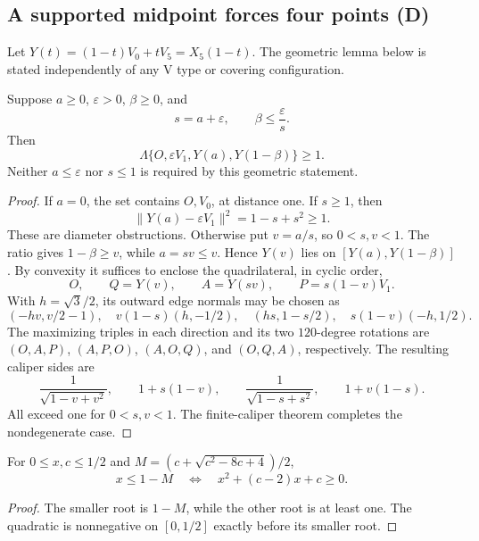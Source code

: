 \subsection{A supported midpoint forces four points (D)}

Let $Y(t)=(1-t)V_0+tV_5=X_5(1-t)$. The geometric lemma below is stated
independently of any V type or covering configuration.

\begin{theorem}
\label{thm:fixed-four-point-rescuer}
\label{lem:appendix-fixed-four-point}
Suppose $a\ge0$, $\varepsilon>0$, $\beta\ge0$, and
\[
 s=a+\varepsilon,\qquad \beta\le\frac{\varepsilon}{s}.
\]
Then
\[
 \Lambda\{O,\varepsilon V_1,Y(a),Y(1-\beta)\}\ge1.
\]
Neither $a\le\varepsilon$ nor $s\le1$ is required by this geometric statement.
\end{theorem}
\begin{proof}
If $a=0$, the set contains $O,V_0$, at distance one. If $s\ge1$, then
\[
 \|Y(a)-\varepsilon V_1\|^2=1-s+s^2\ge1.
\]
These are diameter obstructions. Otherwise put $v=a/s$, so $0<s,v<1$.
The ratio gives $1-\beta\ge v$, while $a=sv\le v$. Hence $Y(v)$ lies
on $[Y(a),Y(1-\beta)]$. By convexity it suffices to enclose the quadrilateral,
in cyclic order,
\[
 O,\qquad Q=Y(v),\qquad A=Y(sv),\qquad P=s(1-v)V_1.
\]
With $h=\sqrt3/2$, its outward edge normals may be chosen as
\[
 (-hv,v/2-1),\quad v(1-s)(h,-1/2),\quad
 (hs,1-s/2),\quad s(1-v)(-h,1/2).
\]
The maximizing triples in each direction and its two $120$-degree rotations
are $(O,A,P)$, $(A,P,O)$, $(A,O,Q)$, and $(O,Q,A)$, respectively.
The resulting caliper sides are
\[
 \frac1{\sqrt{1-v+v^2}},\qquad 1+s(1-v),\qquad
 \frac1{\sqrt{1-s+s^2}},\qquad 1+v(1-s).
\]
All exceed one for $0<s,v<1$. The finite-caliper theorem
 completes the nondegenerate case.
\end{proof}



\begin{lemma}
\label{lem:rescuer-ratio-test}
For $0\le x,c\le1/2$ and $M=(c+\sqrt{c^2-8c+4})/2$,
\[
 x\le1-M\quad\Longleftrightarrow\quad x^2+(c-2)x+c\ge0.
\]
\end{lemma}
\begin{proof}
The smaller root is $1-M$, while the other root is at least one.
The quadratic is nonnegative on $[0,1/2]$ exactly before its smaller root.
\end{proof}

